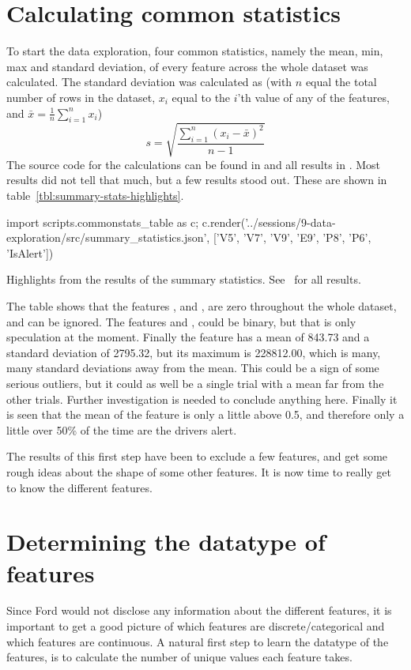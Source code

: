 \section{Calculating common statistics}\label{sec:summary-statistics}
To start the data exploration, four common statistics, namely the mean, min, max and standard deviation, of every feature across the whole dataset was calculated. The standard deviation was calculated as (with $n$ equal the total number of rows in the dataset, $x_i$ equal to the $i$'th value of any of the features, and $\bar{x}=\frac{1}{n}\sum_{i=1}^n x_i$)
\[
    s = \sqrt{\frac{\sum_{i=1}^n (x_i-\bar{x})^2}{n-1}}
\]
The source code for the calculations can be found in  and all results in . Most results did not tell that much, but a few results stood out. These are shown in table~\ref{tbl:summary-stats-highlights}.
\begin{table}
    {\small\sffamily
        \begin{python}
            import scripts.commonstats_table as c; c.render('../sessions/9-data-exploration/src/summary_statistics.json', ['V5', 'V7', 'V9', 'E9', 'P8', 'P6', 'IsAlert'])
        \end{python}
    }
    \caption{Highlights from the results of the summary statistics. See~ for all results.}
    \label{tbl:summary-stats-highlights}
\end{table}
The table shows that the features ,  and , are zero throughout the whole dataset, and can be ignored. The features  and , could be binary, but that is only speculation at the moment. Finally the feature  has a mean of 843.73 and a standard deviation of 2795.32, but its maximum is 228812.00, which is many, many standard deviations away from the mean. This could be a sign of some serious outliers, but it could as well be a single trial with a mean far from the other trials. Further investigation is needed to conclude anything here. Finally it is seen that the mean of the  feature is only a little above 0.5, and therefore only a little over 50\% of the time are the drivers alert.\par
The results of this first step have been to exclude a few features, and get some rough ideas about the shape of some other features. It is now time to really get to know the different features.

\section{Determining the datatype of features}
Since Ford would not disclose any information about the different features, it is important to get a good picture of which features are discrete/categorical and which features are continuous. A natural first step to learn the datatype of the features, is to calculate the number of unique values each feature takes.
